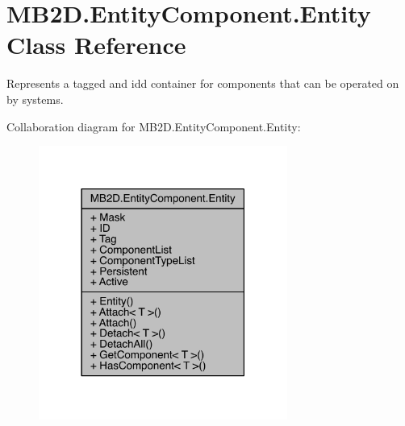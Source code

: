 \hypertarget{class_m_b2_d_1_1_entity_component_1_1_entity}{}\section{M\+B2\+D.\+Entity\+Component.\+Entity Class Reference}
\label{class_m_b2_d_1_1_entity_component_1_1_entity}


Represents a tagged and id\textquotesingle{}d container for components that can be operated on by systems.  




Collaboration diagram for M\+B2\+D.\+Entity\+Component.\+Entity\+:\nopagebreak
\begin{figure}[H]
\begin{center}
\leavevmode
\includegraphics[width=231pt]{class_m_b2_d_1_1_entity_component_1_1_entity__coll__graph}
\end{center}
\end{figure}
